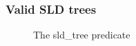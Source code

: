 \documentclass[sigplan,10pt,anonymous,review]{acmart}
\begin{document}






















\subsubsection{Valid SLD trees}\label{sec:validtree}
\begin{figure}[b]
    
    \caption{The sld\_tree predicate\label{fig:vt} }
\end{figure}
\end{document}
